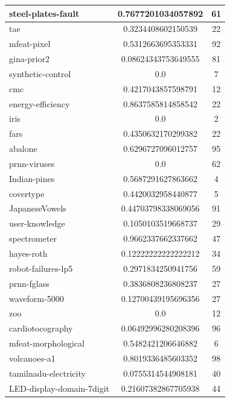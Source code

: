 \documentclass[times,specification,annotation]{itmo-student-thesis}
\begin{document}
\begin{center}
\begin{longtable}{ |m{5cm}|c|c| }
			\hline
			steel-plates-fault & 0.7677201034057892 & 61 \\
			\hline
			tae & 0.3234408602150539 & 22 \\
			\hline
			mfeat-pixel & 0.5312663695353331 & 92 \\
			\hline
			gina-prior2 & 0.08624343753649555 & 81 \\
			\hline
			synthetic-control & 0.0 & 7 \\
			\hline
			cmc & 0.4217043857598791 & 12 \\
			\hline
			energy-efficiency & 0.8637585814858542 & 22 \\
			\hline
			iris & 0.0 & 2 \\
			\hline
			fars & 0.4350632170299382 & 22 \\
			\hline
			abalone & 0.6296727096012757 & 95 \\
			\hline
			prnn-viruses & 0.0 & 62 \\
			\hline
			Indian-pines & 0.5687291627863662 & 4 \\
			\hline
			covertype & 0.4420032958440877 & 5 \\
			\hline
			JapaneseVowels & 0.44703798338069056 & 91 \\
			\hline
			user-knowledge & 0.1050103519668737 & 29 \\
			\hline
			spectrometer & 0.9662337662337662 & 47 \\
			\hline
			hayes-roth & 0.12222222222222212 & 34 \\
			\hline
			robot-failures-lp5 & 0.2971834250941756 & 59 \\
			\hline
			prnn-fglass & 0.3836808236808237 & 27 \\
			\hline
			waveform-5000 & 0.12700439195696356 & 27 \\
			\hline
			zoo & 0.0 & 12 \\
			\hline
			cardiotocography & 0.06492996280208396 & 96 \\
			\hline
			mfeat-morphological & 0.5482421206646882 & 6 \\
			\hline
			volcanoes-a1 & 0.8019336485603352 & 98 \\
			\hline
			tamilnadu-electricity & 0.0755314544908181 & 40 \\
			\hline
			LED-display-domain-7digit & 0.21607382867705938 & 44 \\
			\hline
			
		\end{longtable}
	\end{center}
	
\end{document}
